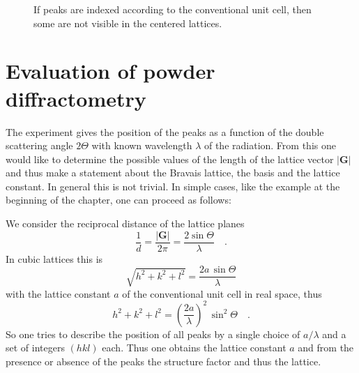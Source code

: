 \begin{figure}
  \caption{If peaks are indexed according to the conventional unit cell, then some are not visible in the centered lattices. }
\end{figure}


\section{Evaluation of powder diffractometry}

The experiment gives the position of the peaks as a function of the double scattering angle $2\Theta$ with known wavelength $\lambda$ of the radiation. From this one would like to determine the possible values of the length of the lattice vector $|\mathbf{G}|$ and thus make a statement about the Bravais lattice, the basis and the lattice constant. In general this is not trivial. In simple cases, like the example at the beginning of the chapter, one can proceed as follows:

We consider the reciprocal distance of the lattice planes
\begin{equation}
\frac{1}{d} = \frac{|\mathbf{G}|}{2 \pi} = \frac{2 \sin \Theta}{ \lambda}  \quad .
\end{equation}
In cubic lattices this is
\begin{equation}
 \sqrt{h^2 + k^2 + l^2} = \frac{2 a \, \sin \Theta}{ \lambda}
\end{equation}
with the lattice constant $a$ of the conventional unit cell in real space, thus 
\begin{equation}
 h^2 + k^2 + l^2 = \left(\frac{2 a }{ \lambda} \right)^2 \, \sin^2 \Theta \quad .
\end{equation}
So one tries to describe the position of all peaks by a single choice of $a/\lambda$ and a set of integers $(hkl)$ each. Thus one obtains the lattice constant $a$ and from the presence or absence of the peaks the structure factor and thus the lattice.




\printbibliography[segment=\therefsegment,heading=subbibliography]

